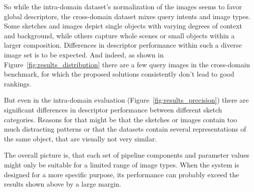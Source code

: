 So while the intra-domain dataset's normalization of the images seems to favor
global descriptors, the cross-domain dataset mixes query intents and image
types. Some sketches and images depict single objects with varying degrees of
context and background, while others capture whole scenes or small objects
within a larger composition. Differences in descriptor performance within such
a diverse image set is to be expected. And indeed, as shown in
Figure~\ref{fig:results_distribution} there are a few query images in the
cross-domain benchmark, for which the proposed solutions consistently don't
lead to good rankings. 

But even in the intra-domain evaluation (Figure~\ref{fig:results_precision})
there are significant differences in descriptor performance between different
sketch categories. Reasons for that might be that the sketches or images
contain too much distracting patterns or that the datasets contain several
representations of the same object, that are visually not very similar. 

The overall picture is, that each set of pipeline components and parameter
values might only be suitable for a limited range of image types. When the
system is designed for a more specific purpose, its performance can probably
exceed the results shown above by a large margin.
